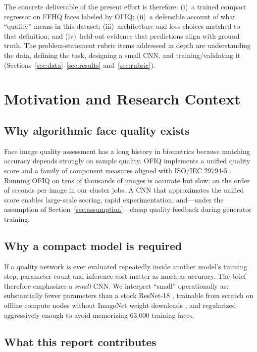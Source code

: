 \documentclass[12pt, letterpaper, titlepage]{article}
\begin{document}
The concrete deliverable of the present effort is therefore: (i)~a trained compact regressor on FFHQ faces labeled by OFIQ; (ii)~a defensible account of what ``quality'' means in this dataset; (iii)~architecture and loss choices matched to that definition; and (iv)~held-out evidence that predictions align with ground truth. The problem-statement rubric items addressed in depth are understanding the data, defining the task, designing a small CNN, and training/validating it (Sections~\ref{sec:data}--\ref{sec:results} and~\ref{sec:rubric}).

\section{Motivation and Research Context}
\label{sec:motivation}

\subsection{Why algorithmic face quality exists}

Face image quality assessment has a long history in biometrics because matching accuracy depends strongly on sample quality. OFIQ implements a unified quality score and a family of component measures aligned with ISO/IEC 29794-5 \citep{iso29794_5_2025,bsi2024ofiq}. Running OFIQ on tens of thousands of images is accurate but slow: on the order of seconds per image in our cluster jobs. A CNN that approximates the unified score enables large-scale scoring, rapid experimentation, and---under the assumption of Section~\ref{sec:assumption}---cheap quality feedback during generator training.

\subsection{Why a compact model is required}

If a quality network is ever evaluated repeatedly inside another model's training step, parameter count and inference cost matter as much as accuracy. The brief therefore emphasizes a \emph{small} CNN. We interpret ``small'' operationally as: substantially fewer parameters than a stock ResNet-18 \citep{he2016resnet}, trainable from scratch on offline compute nodes without ImageNet weight downloads \citep{deng2009imagenet,paszke2019pytorch}, and regularized aggressively enough to avoid memorizing 63{,}000 training faces.

\subsection{What this report contributes}
\end{document}
